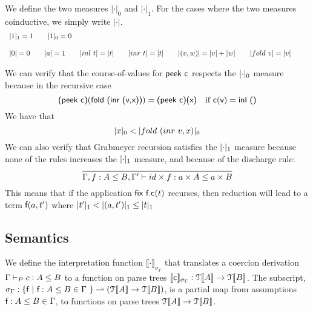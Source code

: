 \documentclass[a4paper,UKenglish,cleveref, autoref, thm-restate]{lipics-v2021}
\begin{document}
\begin{definition}
We define the two measures $|\cdot|_0$ and $|\cdot|_1$. For the cases where the two measures coinductive, we simply write $|\cdot|$.
  \begin{displaymath}
    \begin{array}{lll}
\onem{1} = 1 \qquad \zerom{1} = 0
\\\\
 \measure{0} = 0 \qquad \measure{a} = 1 \qquad \measure{inl~ t} = \measure{t} \qquad \measure{inr~ t} = \measure{t} \qquad  \measure{(v,w)}=\measure{v}+\measure{w} \qquad  \measure{fold~v}=\measure{v}\qquad


    \end{array}
  \end{displaymath}
\end{definition}
We can verify that the course-of-values for $\textsf{peek c}$ respects the $\zerom{\cdot}$ measure because in the recursive case \[\textsf{(peek c)}(\textsf{fold (inr (v,x))})=\textsf{(peek c)(x)}\quad \text{if }\textsf{c}(\textsf{v})=\textsf{inl ()}\]
We have that 
\[ \zerom{x} < \zerom{fold~ (inr~ v,x)}\]
We can also verify that Grabmeyer recursion satisfies the $\onem{\cdot}$ measure because none of the rules increases the $\onem{\cdot}$ measure, and because of the discharge rule:
\[\infer{\contains{\Gamma, f : A \leq B, \Gamma'}{id \times f}{a \times A}{a \times B}}{}\]
This means that if the application $\textsf{fix f.c}(t)$ recurses, then reduction will lead to a term $\textsf{f}(a,t')$ where $\onem{t'} < \onem{(a,t')}\leq \onem{t}$\\
\subsection{Semantics}
We define the interpretation function $\llbracket \cdot \rrbracket_{\sigma_{\Gamma}}$ that translates a coercion derivation $\containsG{c}{A}{B}$ to a function on parse trees $\llbracket \textsf{c} \rrbracket_{\sigma_{\Gamma}} : \mathcal{T}\llbracket A \rrbracket  \rightarrow \mathcal{T}\llbracket B \rrbracket$. The subscript, $\sigma_{\Gamma} : \{ \textsf{f} ~|~\textsf{f} : A \leq B  \in \Gamma \ \} \rightharpoonup  (\mathcal{T}\llbracket A \rrbracket \rightarrow \mathcal{T}\llbracket B \rrbracket)$, is a partial map from assumptions $\textsf{f} : A \leq B  \in \Gamma$, to functions on parse trees $\mathcal{T}\llbracket A \rrbracket \rightarrow \mathcal{T}\llbracket B \rrbracket$. 
\end{document}
